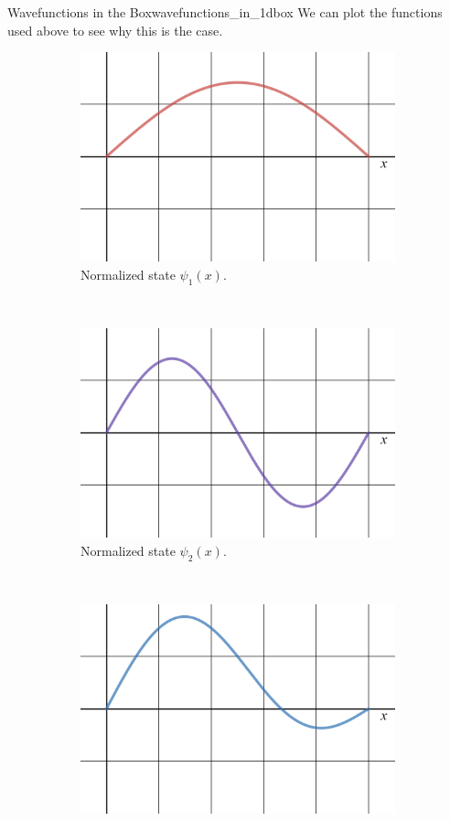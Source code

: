 \begin{ex}{Wavefunctions in the Box}{wavefunctions_in_1dbox}
	We can plot the functions used above to see why this is the case.
	\begin{figure}[H]
	\centering
		\begin{subfigure}[h]{0.49\textwidth}
			\centering
			\includegraphics[width=.8\textwidth]{Figures_Part_5/psi_1.png}
			\caption{Normalized state $\psi_1(x)$.}
		\end{subfigure}
		~
		\begin{subfigure}[h]{0.49\textwidth}
			\centering
			\includegraphics[width=.8\textwidth]{Figures_Part_5/psi_2.png}
			\caption{Normalized state $\psi_2(x)$.}
		\end{subfigure}
		\\
		\begin{subfigure}[h]{0.49\textwidth}
			\centering
			\includegraphics[width=.8\textwidth]{Figures_Part_5/Psi.png}

\end{subfigure}
\end{figure}
\end{ex}
